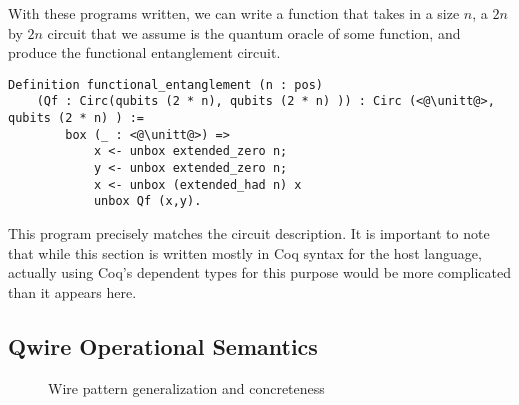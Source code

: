 With these programs written, we can write a function that takes in a size $n$, a $2n$ by $2n$ circuit that we assume is the quantum oracle of some function, and produce the functional entanglement circuit.
\begin{lstlisting}[style=customcoq]
Definition functional_entanglement (n : pos) 
    (Qf : Circ(qubits (2 * n), qubits (2 * n) )) : Circ (<@\unitt@>, qubits (2 * n) ) :=
        box (_ : <@\unitt@>) =>
            x <- unbox extended_zero n;
            y <- unbox extended_zero n;
            x <- unbox (extended_had n) x 
            unbox Qf (x,y).
\end{lstlisting}

This program precisely matches the circuit description.
It is important to note that while this section is written mostly in Coq syntax for the host language, actually using Coq's dependent types for this purpose would be more complicated than it appears here.

\subsection{Qwire Operational Semantics}
\begin{figure}[t]
\caption{Wire pattern generalization and concreteness}
\label{fig:concrete}
\end{figure}

